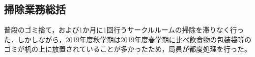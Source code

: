 \subsection*{掃除業務総括}

普段のゴミ捨て，および1か月に1回行うサークルルームの掃除を滞りなく行った．しかしながら，2019年度秋学期は2019年度春学期に比べ飲食物の包装袋等のゴミが机の上に放置されていることが多かったため，局員が都度処理を行った。
